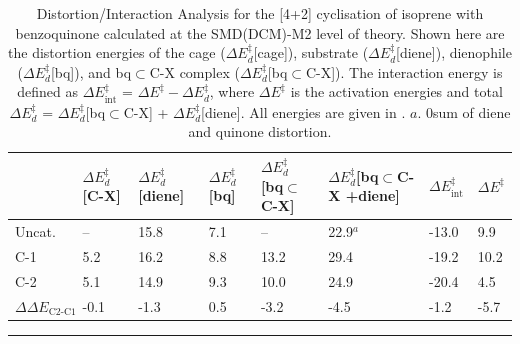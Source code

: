 \documentclass[../../main.tex]{subfiles}
\begin{document}
\begin{table}[h!]
	\def\arraystretch{2.0}
	\begin{tabularx}{\textwidth}{YYYYYYYY}
		\hline
		& \small{$\Delta E^\ddagger_d$ [C-X]} &\small{$\Delta E^\ddagger_d$ [diene]}&	\small{$\Delta E^\ddagger_d$ [bq]}&	\small{$\Delta E^\ddagger_d$ [bq$\subset$C-X]} &	\small{$\Delta E^\ddagger_d$[bq$\subset$C-X +diene]} &  \small{$\Delta E^\ddagger_\text{int}$} & \small{$\Delta E^\ddagger$
}\\
		\hline
		Uncat.         	&--	 &   15.8 	&7.1	&--	&22.9${}^a$&	-13.0&	9.9
\\
		C-1	               &5.2	  &  16.2&	8.8	  &13.2&	29.4&	-19.2&	10.2
\\
		C-2               &	5.1	 &   14.9	&9.3&	10.0&	24.9&	-20.4&	4.5
\\
		$\Delta\Delta E_\text{C2-C1}$ &	-0.1	&-1.3&	0.5	&-3.2&	-4.5&	-1.2&	-5.7
\\
	\end{tabularx}
\hrule
\caption{Distortion/Interaction Analysis for the [4+2] cyclisation of isoprene with benzoquinone calculated at the SMD(DCM)-M2 level of theory. Shown here are the distortion energies of the cage ($\Delta E^\ddagger_d$[cage]), substrate ($\Delta E^\ddagger_d$[diene]), dienophile ($\Delta E^\ddagger_d$[bq]), and bq$\subset$C-X complex ($\Delta E^\ddagger_d$[bq$\subset$C-X]). The interaction energy is defined as $\Delta E^\ddagger_\text{int}$ = $\Delta E^\ddagger - \Delta E^\ddagger_d$, where $\Delta E^\ddagger$ is the activation energies and total $\Delta E^\ddagger_d$ = $\Delta E^\ddagger_d$[bq$\subset$C-X] + $\Delta E^\ddagger_d$[diene]. All energies are given in \kcal. $a.$ 0sum of diene and quinone distortion.}
\label{table::da1}
\end{table}
\end{document}
